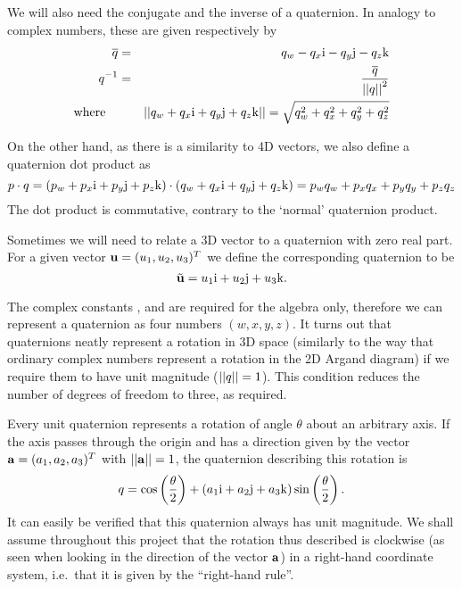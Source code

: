 We will also need the conjugate and the inverse of a quaternion. In analogy to
complex numbers, these are given respectively by
\begin{eqnarray}
\overline{\mbox{$q$}} & = & q_w - q_x\mbox{$\mathrm{i}$} - q_y\mbox{$\mathrm{j}$} - q_z\mbox{$\mathrm{k}$}\\
\mbox{$q$}^{-1} & = & \frac{\overline{\mbox{$q$}}}{\mbox{$||\mbox{$q$}||$}^2}\\
\mathrm{where}\quad&& \mbox{$||q_w + q_x\mbox{$\mathrm{i}$} + q_y\mbox{$\mathrm{j}$} + q_z\mbox{$\mathrm{k}$}||$} =
    \sqrt{q_w^2 + q_x^2 + q_y^2 + q_z^2}
\end{eqnarray}

On the other hand, as there is a similarity to 4D vectors, we also define a
quaternion dot product as
\begin{equation}
\mbox{$p$}\cdot\mbox{$q$} =
    (p_w + p_x\mbox{$\mathrm{i}$} + p_y\mbox{$\mathrm{j}$} + p_z\mbox{$\mathrm{k}$})\cdot (q_w + q_x\mbox{$\mathrm{i}$} + q_y\mbox{$\mathrm{j}$} + q_z\mbox{$\mathrm{k}$}) =
    p_w q_w + p_x q_x + p_y q_y + p_z q_z
\end{equation}
The dot product is commutative, contrary to the `normal' quaternion product.

Sometimes we will need to relate a 3D vector to a quaternion with zero real part.
For a given vector $\ve{u} = (u_1, u_2, u_3)^T$ we define the corresponding
quaternion to be
\begin{equation}
\label{vectorToQuat}
\tilde{\ve{u}} = u_1\qi + u_2\qj + u_3\qk.
\end{equation}

The complex constants \qi{}, \qj{} and \qk{} are required for the algebra
only, therefore we can represent a quaternion as four numbers $(w,x,y,z)$. It turns out that
quaternions neatly represent a rotation in 3D space (similarly to the way that ordinary complex
numbers represent a rotation in the 2D Argand diagram) if we require them to have unit
magnitude ($\mbox{$||\mbox{$q$}||$} = 1$).  This condition reduces the number of degrees of freedom to three,
as required.

Every unit quaternion represents a rotation of angle $\theta$ about an arbitrary axis.
If the axis passes through the origin and has a direction given by the vector
$\ve{a} = (a_1, a_2, a_3)^T$ with $\norm{\ve{a}} = 1$, the quaternion describing
this rotation is
\begin{equation}
\label{quatRotation}
\mbox{$q$} = \cos\left(\frac{\theta}{2}\right) + (a_1\mbox{$\mathrm{i}$} + a_2\mbox{$\mathrm{j}$} +
    a_3\mbox{$\mathrm{k}$}) \sin\left(\frac{\theta}{2}\right).
\end{equation}
It can easily be verified that this quaternion always has unit magnitude.
We shall assume throughout this project that the rotation thus described is clockwise (as seen
when looking in the direction of the vector $\ve{a}$) in a right-hand coordinate system,
i.e.\ that it is given by the ``right-hand rule''.

